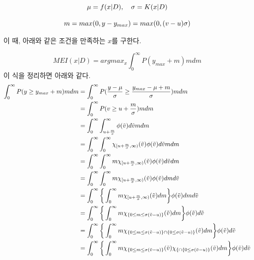 \documentclass[a4paper]{oblivoir}
\begin{document}
\begin{equation}
\mu = f(x|D), \quad \sigma = K(x|D)\nonumber\\
\label{eq:12-42}
\end{equation}

\begin{equation}
m = max(0, y-y_{max}) = max(0,(v-u)\sigma)\nonumber\\
\label{eq:12-43}
\end{equation}

이 때, 아래와 같은 조건을 만족하는 $x$를 구한다.

\begin{equation}
MEI(x|D) = argmax_{x}\int_{0}^{\infty}P(y_{max}+ m)m dm
\label{eq:12-44}
\end{equation} 
이 식을 정리하면 아래와 같다.
\begin{equation}
\allowdisplaybreaks
\begin{aligned}
\int_{0}^{\infty}P(y \geq y_{max}+ m)m dm & = \int_{0}^{\infty}P(\frac{y-\mu}{\sigma} \geq \frac{y_{max} -\mu + m}{\sigma})m dm \nonumber\\
& = \int_{0}^{\infty}P(v \geq u + \frac{m}{\sigma})m dm \nonumber\\
& = \int_{0}^{\infty} \int_{u+\frac{m}{\sigma}}^{\infty}\phi(\tilde{v}) d\tilde{v} m dm \nonumber\\
& = \int_{0}^{\infty} \int_{0}^{\infty} \chi_{[u+\frac{m}{\sigma},\infty)}(\tilde{v})\phi(\tilde{v})d\tilde{v} m dm\nonumber\\
& = \int_{0}^{\infty} \int_{0}^{\infty} m\chi_{[u+\frac{m}{\sigma},\infty)}(\tilde{v})\phi(\tilde{v})d\tilde{v} dm\nonumber\\
& = \int_{0}^{\infty} \int_{0}^{\infty} m\chi_{[u+\frac{m}{\sigma},\infty)}(\tilde{v})\phi(\tilde{v})dm d\tilde{v}\nonumber\\
& = \int_{0}^{\infty} \bigg\{\int_{0}^{\infty} m\chi_{[u+\frac{m}{\sigma},\infty)}(\tilde{v})dm\bigg\}\phi(\tilde{v})dm d\tilde{v}\nonumber\\
& = \int_{0}^{\infty} \bigg\{\int_{0}^{\infty} m\chi_{\{0 \leq m \leq \sigma(\tilde{v}-u)\}}(\tilde{v}) dm \bigg\} \phi(\tilde{v})d\tilde{v}\nonumber\\
& = \int_{0}^{\infty} \bigg\{\int_{0}^{\infty} m\chi_{\{0 \leq m \leq \sigma(\tilde{v}-u)\} \cap \{0 \leq \sigma(\tilde{v}-u)\}}(\tilde{v}) dm \bigg\} \phi(\tilde{v})d\tilde{v}\nonumber\\
& = \int_{0}^{\infty} \bigg\{\int_{0}^{\infty} m\chi_{\{0 \leq m \leq \sigma(\tilde{v}-u)\}}(\tilde{v}) \chi_{\{\cap \{0 \leq \sigma(\tilde{v}-u)\}}(\tilde{v}) dm \bigg\} \phi(\tilde{v})d\tilde{v}\nonumber\\

\end{aligned}
\end{equation}
\end{document}
